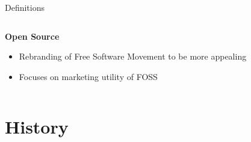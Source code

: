 \documentclass[9pt, dvipsnames]{beamer}
\begin{document}
\begin{frame}{Definitions}
{\begin{columns}[t]
{\begin{column}{0.5\textwidth}
\begin{figure}
                    \end{figure}
                    \textbf{Open Source}
                    \begin{itemize}
                        \item Rebranding of Free Software Movement to be more
                        appealing
                        \item Focuses on marketing utility of FOSS
                    \end{itemize}
                \end{column}
            }
        \end{columns}
    }
\end{frame}

\section{History}
\end{document}
